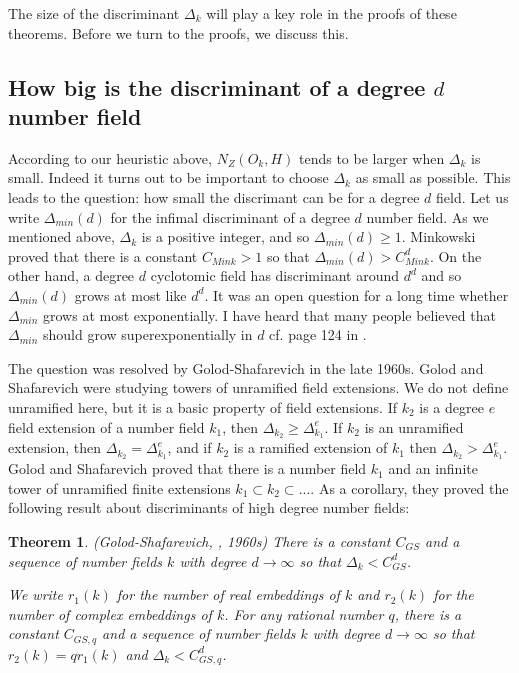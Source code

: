 \documentclass{amsart}
\newtheorem{theorem}[prop]{Theorem}
\begin{document}
 The size of the discriminant $\Delta_k$ will play a key role in the proofs of these theorems.  Before we turn to the proofs, we discuss this.
 
\subsection{How big is the discriminant of a degree $d$ number field} \label{subsecdiscr}

According to our heuristic above, $N_Z(O_k, H)$ tends to be larger when $\Delta_k$ is small.  Indeed it turns out to be important to choose $\Delta_k$ as small as possible.  This leads to the question: how small  the discrimant can be for a degree $d$ field.    Let us write $\Delta_{min}(d)$ for the infimal discriminant of a degree $d$ number field.  As we mentioned above, $\Delta_k$ is a positive integer, and so $\Delta_{min}(d) \ge 1$.  Minkowski proved that there is a constant $C_{Mink} > 1$ so that $\Delta_{min}(d) > C_{Mink}^d$.   On the other hand,  a degree $d$ cyclotomic field has discriminant around $d^d$ and so $\Delta_{min}(d)$ grows at most like $d^d$.    It was an open question for a long time whether $\Delta_{min}$ grows at most exponentially.   I have heard that many people believed that $\Delta_{min}$ should grow superexponentially in $d$ cf. page 124 in \cite{O}.   

The question was resolved by Golod-Shafarevich in the late 1960s.   Golod and Shafarevich were studying towers of unramified field extensions.  We do not define unramified here, but it is a basic property of field extensions.  If $k_2$ is a degree $e$ field extension of a number field $k_1$, then $\Delta_{k_2} \ge \Delta_{k_1}^e$.  If $k_2$ is an unramified extension, then $\Delta_{k_2} = \Delta_{k_1}^e$, and if $k_2$ is a ramified extension of $k_1$ then $\Delta_{k_2} > \Delta_{k_1}^e$.  Golod and Shafarevich proved that there is a number field $k_1$ and an infinite tower of unramified finite extensions $k_1 \subset k_2 \subset ...$.  As a corollary, they proved the following result about discriminants of high degree number fields:

\begin{theorem} \label{thmmart} (Golod-Shafarevich,  \cite{GS},  1960s) There is a constant $C_{GS}$ and a sequence of number fields $k$ with degree $d \rightarrow \infty$ so that $\Delta_k < C_{GS}^d$.  

We write $r_1(k)$ for the number of real embeddings of $k$ and $r_2(k)$ for the number of complex embeddings of $k$.  For any rational number $q$, there is a constant $C_{GS,q}$ and a sequence of number fields $k$ with degree $d \rightarrow \infty$ so that $r_2(k) = q r_1(k)$ and $\Delta_k < C_{GS,q}^d$.   \end{theorem}
\end{document}
